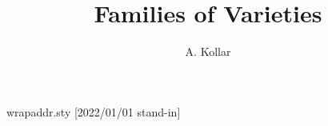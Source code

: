 \begin{filecontents*}{wrapaddr.sty}
[2022/01/01 stand-in]
\def\displayaddresses{}
\let\@pigaaddress\address
\renewcommand{\address}[1]{\g@addto@macro{\displayaddresses}{\par\noindent#1}\@pigaaddress{#1}}
\let\orgemail=\email
\renewcommand{\email}[1]{\orgemail{\href{mailto:#1}{#1}}}
\end{filecontents*}
\documentclass{amsart}
\usepackage{hyperref}
\usepackage{wrapaddr}

\title{Families of Varieties}
\author{A. Kollar}
\address{Princeton University}
\maketitle
Body.

\displayaddresses

